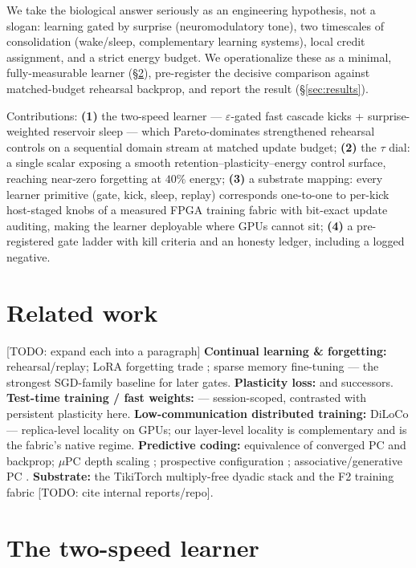 \documentclass[11pt]{article}
\newcommand{\todo}[1]{\textcolor{red!70!black}{[TODO: #1]}}
\begin{document}
We take the biological answer seriously as an engineering hypothesis, not a slogan: learning
gated by surprise (neuromodulatory tone), two timescales of consolidation (wake/sleep,
complementary learning systems), local credit assignment, and a strict energy budget. We
operationalize these as a minimal, fully-measurable learner (\S\ref{sec:method}), pre-register
the decisive comparison against matched-budget rehearsal backprop, and report the result
(\S\ref{sec:results}).

Contributions: \textbf{(1)} the two-speed learner --- $\varepsilon$-gated fast cascade kicks +
surprise-weighted reservoir sleep --- which Pareto-dominates strengthened rehearsal controls on
a sequential domain stream at matched update budget; \textbf{(2)} the $\tau$ dial: a single
scalar exposing a smooth retention--plasticity--energy control surface, reaching near-zero
forgetting at $40\%$ energy; \textbf{(3)} a substrate mapping: every learner primitive
(gate, kick, sleep, replay) corresponds one-to-one to per-kick host-staged knobs of a measured
FPGA training fabric with bit-exact update auditing, making the learner deployable where
GPUs cannot sit; \textbf{(4)} a pre-registered gate ladder with kill criteria and an honesty
ledger, including a logged negative.

\section{Related work}\label{sec:related}
\todo{expand each into a paragraph}
\textbf{Continual learning \& forgetting:} rehearsal/replay; LoRA forgetting trade
\citep{biderman2024lora}; sparse memory fine-tuning \citep{meta2025sparsemem} --- the strongest
SGD-family baseline for later gates. \textbf{Plasticity loss:} \citep{dohare2024loss} and
successors. \textbf{Test-time training / fast weights:} \citep{behrouz2025titans,
ttte2e2025} --- session-scoped, contrasted with persistent plasticity here.
\textbf{Low-communication distributed training:} DiLoCo \citep{douillard2023diloco} ---
replica-level locality on GPUs; our layer-level locality is complementary and is the fabric's
native regime. \textbf{Predictive coding:} equivalence of converged PC and backprop; $\mu$PC
depth scaling \citep{mupc2025}; prospective configuration \citep{song2024inferring};
associative/generative PC \citep{salvatori2021associative}. \textbf{Substrate:} the TikiTorch
multiply-free dyadic stack and the F2 training fabric \todo{cite internal reports/repo}.

\section{The two-speed learner}\label{sec:method}
\end{document}
